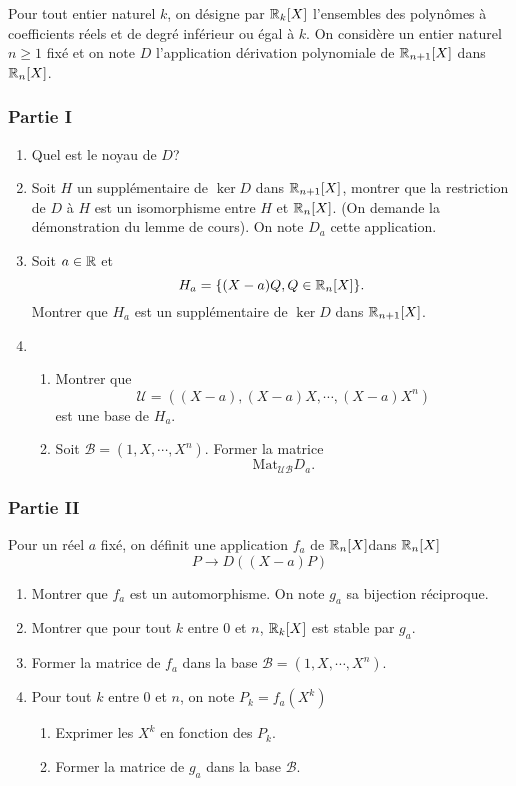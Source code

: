 Pour tout entier naturel $k$, on d{\'e}signe par $\mathbb{R}_k[X]$
l'ensembles des polyn{\^o}mes {\`a} coefficients r{\'e}els et de degr{\'e}
inf{\'e}rieur ou {\'e}gal {\`a} $k$. On consid{\`e}re un entier naturel $n \geq 1$
fix{\'e} et on note $D$ l'application d{\'e}rivation polynomiale de
$\mathbb{R}_{n+1}[X]$ dans $\mathbb{R}_n[X]$.
 \subsubsection*{Partie I}
\begin{enumerate}
  \item Quel est le noyau de $D$?
  \item  Soit $H$ un suppl{\'e}mentaire de $\ker D$ dans
  $\mathbb{R}_{n+1}[X]$, montrer que la restriction de $D$ {\`a} $H$ est
  un isomorphisme entre $H$ et $\mathbb{R}_{n}[X]$. (On demande la
  d{\'e}monstration du lemme de cours). On note $D_a$ cette
  application.
  \item Soit $a\in \mathbb{R}$ et
  \[H_a=\{(X-a)Q, Q\in \mathbb{R}_{n}[X]\}.\]
  Montrer que $H_a$ est un suppl{\'e}mentaire de $\ker D$ dans
  $\mathbb{R}_{n+1}[X]$.
  \item
\begin{enumerate}
  \item Montrer que
  \[\mathcal{U}=\left((X-a),(X-a)X,\cdots,(X-a)X^n \right) \]
  est une base de $H_a$.
  \item Soit $\mathcal{B}=\left(1,X,\cdots,X^n \right)$. Former la
  matrice
  \[\mathrm{Mat}_{\mathcal{U}\mathcal{B}}D_a.\]
\end{enumerate}
\end{enumerate}


  \subsubsection*{Partie II}
  Pour un r{\'e}el $a$ fix{\'e}, on d{\'e}finit une application $f_a$ de
  $\mathbb{R}_{n}[X]$dans $\mathbb{R}_{n}[X]$
  \[P \rightarrow D((X-a)P)\]
\begin{enumerate}
  \item Montrer que $f_a$ est un automorphisme. On note $g_a$ sa
  bijection r{\'e}ciproque.
  \item Montrer que pour tout $k$ entre 0 et $n$, $\mathbb{R}_{k}[X]$
  est stable par $g_a$.
  \item Former la matrice de $f_a$ dans la base $\mathcal{B}=\left(1,X,\cdots,X^n \right)$.
  \item Pour tout $k$ entre 0 et $n$, on note $P_k = f_a(X^k)$
\begin{enumerate}
  \item Exprimer les $X^k$ en fonction des $P_k$.
  \item Former la matrice de $g_a$ dans la base $\mathcal{B}$.
\end{enumerate}
\end{enumerate}

